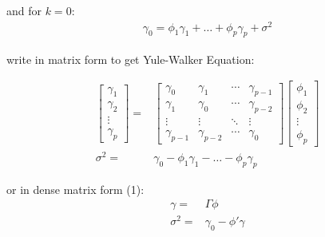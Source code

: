 \begin{itemize}[topsep=2pt,itemsep=0pt]
        and for $ k=0 $:
        \begin{align}
            \gamma _0=\phi _1\gamma _1+\ldots+\phi _p\gamma _p+\sigma ^2
        \end{align}



        write in matrix form to get Yule-Walker Equation:
        
        \begin{align}
            \begin{bmatrix}
                \gamma _1\\\gamma _2\\ \vdots\\\gamma _p
            \end{bmatrix} =&
            \begin{bmatrix}
                \gamma _0&\gamma _1&\cdots&\gamma _{p-1}\\
                \gamma _1&\gamma _0&\cdots&\gamma _{p-2}\\
                \vdots&\vdots&\ddots&\vdots\\
                \gamma _{p-1}&\gamma _{p-2}&\cdots&\gamma _0
            \end{bmatrix}
            \begin{bmatrix}
                \phi _1\\\phi _2\\ \vdots \\\phi _p
            \end{bmatrix}\\
            \sigma ^2 =& \gamma _0-\phi _1\gamma _1-\ldots-\phi _p\gamma _p
        \end{align}
        
        or in dense matrix form (1):
        \begin{align}
            \gamma =&\Gamma \phi \\
            \sigma ^2=&\gamma _0-\phi '\gamma 
        \end{align}


\end{itemize}
